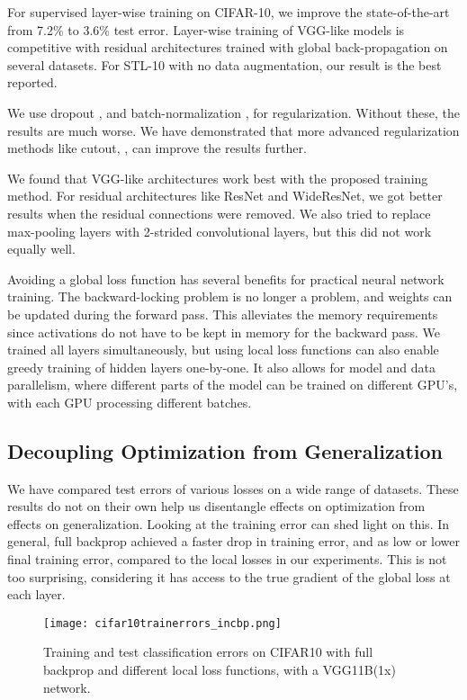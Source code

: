 \documentclass{article}
\begin{document}
For supervised layer-wise training on CIFAR-10, we improve the state-of-the-art from 7.2\% \cite{BelilovskyEO18} to 3.6\% test error. Layer-wise training of VGG-like models is competitive with residual architectures trained with global back-propagation on several datasets. For STL-10 with no data augmentation, our result is the best reported.

We use dropout \cite{SrivastavaHKSS14}, and batch-normalization \cite{IoffeS15}, for regularization. Without these, the results are much worse. We have demonstrated that more advanced regularization methods like cutout, \cite{DevriesT17}, can improve the results further.

We found that VGG-like architectures work best with the proposed training method. For residual architectures like ResNet and WideResNet, we got better results when the residual connections were removed. We also tried to replace max-pooling layers with 2-strided convolutional layers, but this did not work equally well.

Avoiding a global loss function has several benefits for practical neural network training. The backward-locking problem is no longer a problem, and weights can be updated during the forward pass. This alleviates the memory requirements since activations do not have to be kept in memory for the backward pass. We trained all layers simultaneously, but using local loss functions can also enable greedy training of hidden layers one-by-one. It also allows for model and data parallelism, where different parts of the model can be trained on different GPU's, with each GPU processing different batches.

\subsection{Decoupling Optimization from Generalization}

We have compared test errors of various losses on a wide range of datasets. These results do not on their own help us disentangle effects on optimization from effects on generalization. Looking at the training error can shed light on this. In general, full backprop achieved a faster drop in training error, and as low or lower final training error, compared to the local losses in our experiments. This is not too surprising, considering it has access to the true gradient of the global loss at each layer. 

\begin{figure}[h]
  \texttt{[image: cifar10trainerrors\_incbp.png]}
  \caption{Training and test classification errors on CIFAR10 with full backprop and different local loss functions, with a VGG11B(1x) network.}
  \label{fig:cifar10trainerrors}
\end{figure}
\end{document}
